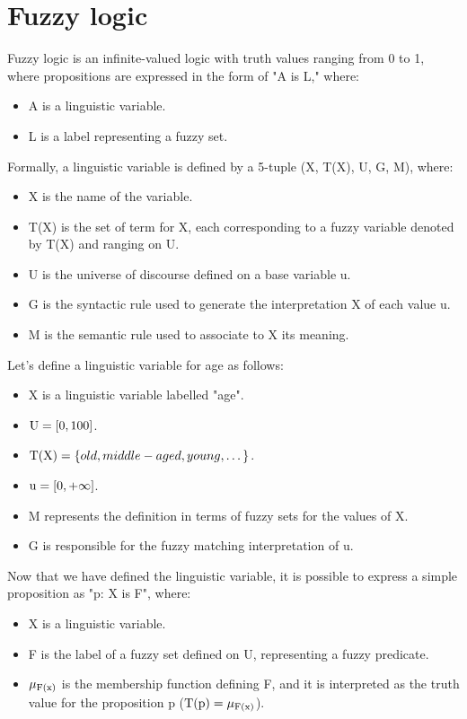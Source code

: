 \section{Fuzzy logic}

Fuzzy logic is an infinite-valued logic with truth values ranging from 0 to 1, where propositions are expressed in the form of "A is L," where:
\begin{itemize}
    \item A is a linguistic variable.
    \item L is a label representing a fuzzy set.
\end{itemize}
Formally, a linguistic variable is defined by a 5-tuple (X, T(X), U, G, M), where: 
\begin{itemize}
    \item X is the name of the variable.
    \item T(X) is the set of term for X, each corresponding to a fuzzy variable denoted by T(X) and ranging on U.
    \item U is the universe of discourse defined on a base variable u.
    \item G is the syntactic rule used to generate the interpretation X of each value u.
    \item M is the semantic rule used to associate to X its meaning.
\end{itemize}
\begin{example}
    Let's define a linguistic variable for age as follows:
    \begin{itemize}
        \item X is a linguistic variable labelled "age".
        \item $\textnormal{U}=[0,100]$.
        \item $\textnormal{T(X)}=\{old, middle-aged, young, \dots\}$.
        \item $\textnormal{u}=[0,+\infty]$.
        \item M represents the definition in terms of fuzzy sets for the values of X.
        \item G is responsible for the fuzzy matching interpretation of u.
    \end{itemize}
\end{example}
Now that we have defined the linguistic variable, it is possible to express a simple proposition as "p: X is F", where:
\begin{itemize}
    \item X is a linguistic variable.
    \item F is the label of a fuzzy set defined on U, representing a fuzzy predicate.
    \item $\mu_{\textnormal{F(x)}}$ is the membership function defining F, and it is interpreted as the truth value for the proposition p ($\textnormal{T(p)}=\mu_{\textnormal{F(x)}}$).
\end{itemize}
